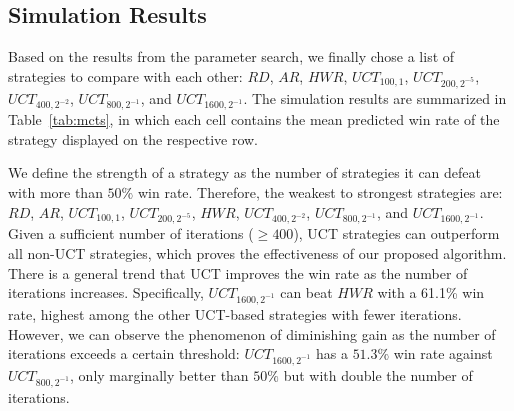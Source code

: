 \begin{table}
  \caption{Mean predicted win rate of row strategy  vs. column strategy. Simulations are based on the drafting rules of match mode ``Captain Mode''. The table can be viewed in a similar way as Table~\ref{tab:mcts}.}
  \label{tab:mcts_captain_mode}
  \centering
\end{table}


\subsection{Simulation Results}
Based on the results from the parameter search, we finally chose a list of strategies to compare with each other: $RD$, $AR$, $HWR$, $UCT_{100, 1}$, $UCT_{200, 2^{-5}}$, $UCT_{400, 2^{-2}}$, $UCT_{800, 2^{-1}}$, and $UCT_{1600, 2^{-1}}$. The simulation results are summarized in Table~\ref{tab:mcts}, in which each cell contains the mean predicted win rate of the strategy displayed on the respective row. 

We define the strength of a strategy as the number of strategies it can defeat with more than $50\%$ win rate. Therefore, the weakest to strongest strategies are: $RD$, $AR$, $UCT_{100, 1}$, $UCT_{200, 2^{-5}}$, $HWR$, $UCT_{400, 2^{-2}}$, $UCT_{800, 2^{-1}}$, and $UCT_{1600, 2^{-1}}$. Given a sufficient number of iterations ($\geq400$), UCT strategies can outperform all non-UCT strategies, which proves the effectiveness of our proposed algorithm. There is a general trend that UCT improves the win rate as the number of iterations increases. Specifically, $UCT_{1600, 2^{-1}}$ can beat $HWR$ with a 61.1\% win rate, highest among the other UCT-based strategies with fewer iterations. However, we can observe the phenomenon of diminishing gain as the number of iterations exceeds a certain threshold: $UCT_{1600, 2^{-1}}$ has a $51.3\%$ win rate against $UCT_{800, 2^{-1}}$, only marginally better than $50\%$ but with double the number of iterations.

